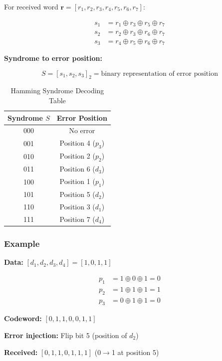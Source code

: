 \documentclass[11pt,a4paper]{article}
\begin{document}
For received word $\mathbf{r} = [r_1, r_2, r_3, r_4, r_5, r_6, r_7]$:

\begin{align}
s_1 &= r_1 \oplus r_3 \oplus r_5 \oplus r_7 \\
s_2 &= r_2 \oplus r_3 \oplus r_6 \oplus r_7 \\
s_3 &= r_4 \oplus r_5 \oplus r_6 \oplus r_7
\end{align}

\textbf{Syndrome to error position:}

\begin{equation}
S = [s_1, s_2, s_3]_2 = \text{binary representation of error position}
\end{equation}

\begin{table}[htbp]
\centering
\caption{Hamming Syndrome Decoding Table}
\begin{tabular}{@{}cc@{}}
\toprule
\textbf{Syndrome} $S$ & \textbf{Error Position} \\ \midrule
000 & No error \\
001 & Position 4 ($p_3$) \\
010 & Position 2 ($p_2$) \\
011 & Position 6 ($d_3$) \\
100 & Position 1 ($p_1$) \\
101 & Position 5 ($d_2$) \\
110 & Position 3 ($d_1$) \\
111 & Position 7 ($d_4$) \\ \bottomrule
\end{tabular}
\end{table}

\subsubsection{Example}

\textbf{Data:} $[d_1, d_2, d_3, d_4] = [1, 0, 1, 1]$

\begin{align}
p_1 &= 1 \oplus 0 \oplus 1 = 0 \\
p_2 &= 1 \oplus 1 \oplus 1 = 1 \\
p_3 &= 0 \oplus 1 \oplus 1 = 0
\end{align}

\textbf{Codeword:} $[0, 1, 1, 0, 0, 1, 1]$

\textbf{Error injection:} Flip bit 5 (position of $d_2$)

\textbf{Received:} $[0, 1, 1, 0, 1, 1, 1]$ (0$\to$1 at position 5)
\end{document}
